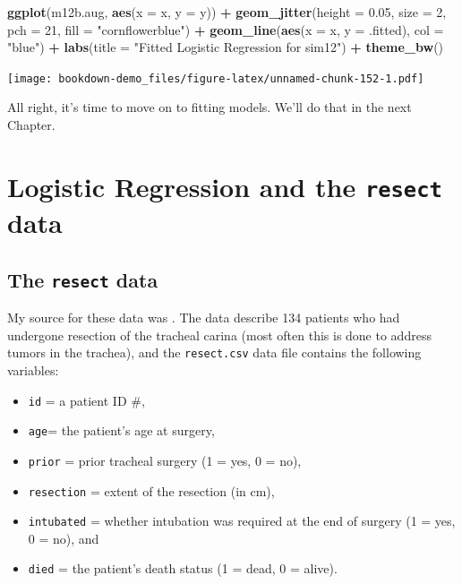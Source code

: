 \documentclass[]{book}
\newenvironment{Shaded}{\begin{snugshade}}{\end{snugshade}}
\newcommand{\KeywordTok}[1]{\textcolor[rgb]{0.13,0.29,0.53}{\textbf{#1}}}
\newcommand{\DataTypeTok}[1]{\textcolor[rgb]{0.13,0.29,0.53}{#1}}
\newcommand{\DecValTok}[1]{\textcolor[rgb]{0.00,0.00,0.81}{#1}}
\newcommand{\FloatTok}[1]{\textcolor[rgb]{0.00,0.00,0.81}{#1}}
\newcommand{\StringTok}[1]{\textcolor[rgb]{0.31,0.60,0.02}{#1}}
\newcommand{\OperatorTok}[1]{\textcolor[rgb]{0.81,0.36,0.00}{\textbf{#1}}}
\newcommand{\NormalTok}[1]{#1}
\providecommand{\tightlist}{%
  \setlength{\itemsep}{0pt}\setlength{\parskip}{0pt}}
\theoremstyle{definition}
\theoremstyle{definition}
\theoremstyle{definition}
\theoremstyle{remark}
\begin{document}
\begin{Shaded}
\begin{Highlighting}[]
\KeywordTok{ggplot}\NormalTok{(m12b.aug, }\KeywordTok{aes}\NormalTok{(}\DataTypeTok{x =}\NormalTok{ x, }\DataTypeTok{y =}\NormalTok{ y)) }\OperatorTok{+}
\StringTok{    }\KeywordTok{geom_jitter}\NormalTok{(}\DataTypeTok{height =} \FloatTok{0.05}\NormalTok{, }\DataTypeTok{size =} \DecValTok{2}\NormalTok{, }\DataTypeTok{pch =} \DecValTok{21}\NormalTok{, }
                \DataTypeTok{fill =} \StringTok{"cornflowerblue"}\NormalTok{) }\OperatorTok{+}
\StringTok{    }\KeywordTok{geom_line}\NormalTok{(}\KeywordTok{aes}\NormalTok{(}\DataTypeTok{x =}\NormalTok{ x, }\DataTypeTok{y =}\NormalTok{ .fitted), }\DataTypeTok{col =} \StringTok{"blue"}\NormalTok{) }\OperatorTok{+}
\StringTok{    }\KeywordTok{labs}\NormalTok{(}\DataTypeTok{title =} \StringTok{"Fitted Logistic Regression for sim12"}\NormalTok{) }\OperatorTok{+}
\StringTok{    }\KeywordTok{theme_bw}\NormalTok{()}
\end{Highlighting}
\end{Shaded}

\texttt{[image: bookdown-demo\_files/figure-latex/unnamed-chunk-152-1.pdf]}

All right, it's time to move on to fitting models. We'll do that in the
next Chapter.

\chapter{\texorpdfstring{Logistic Regression and the \texttt{resect}
data}{Logistic Regression and the resect data}}\label{logistic-regression-and-the-resect-data}

\section{\texorpdfstring{The \texttt{resect}
data}{The resect data}}\label{the-resect-data}

My source for these data was \citet{Riffenburgh2006}. The data describe
134 patients who had undergone resection of the tracheal carina (most
often this is done to address tumors in the trachea), and the
\texttt{resect.csv} data file contains the following variables:

\begin{itemize}
\tightlist
\item
  \texttt{id} = a patient ID \#,
\item
  \texttt{age}= the patient's age at surgery,
\item
  \texttt{prior} = prior tracheal surgery (1 = yes, 0 = no),
\item
  \texttt{resection} = extent of the resection (in cm),
\item
  \texttt{intubated} = whether intubation was required at the end of
  surgery (1 = yes, 0 = no), and
\item
  \texttt{died} = the patient's death status (1 = dead, 0 = alive).
\end{itemize}
\end{document}
